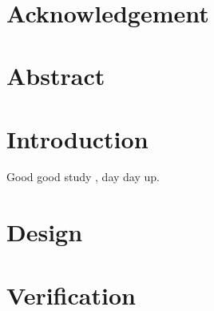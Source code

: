 \documentclass{ece445thesis}
\begin{document}

~\clearpage
\frontmatter

\cleardoublepage

\cleardoublepage
\chapter{Acknowledgement}
\chapter{Abstract}
\tableofcontents{}
\mainmatter\pagestyle{fancy}
\chapter{Introduction}
Good good study \cite{John2024}, day day up.
\chapter{Design}
\chapter{Verification}
\end{document}
